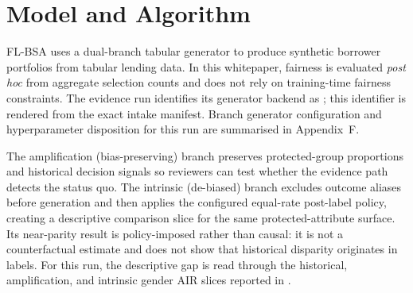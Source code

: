 
\section{Model and Algorithm}
FL-BSA uses a dual-branch tabular generator to produce synthetic borrower portfolios from tabular lending data. In this whitepaper, fairness is evaluated \emph{post hoc} from aggregate selection counts and does not rely on training-time fairness constraints. The \ProductReleaseTag{} evidence run identifies its generator backend as \texttt{\ReleaseGeneratorBackend}; this identifier is rendered from the exact intake manifest. Branch generator configuration and hyperparameter disposition for this run are summarised in Appendix~F.

The amplification (bias-preserving) branch preserves protected-group proportions and historical decision signals so reviewers can test whether the evidence path detects the status quo. The intrinsic (de-biased) branch excludes outcome aliases before generation and then applies the configured equal-rate post-label policy, creating a descriptive comparison slice for the same protected-attribute surface. Its near-parity result is policy-imposed rather than causal: it is not a counterfactual estimate and does not show that historical disparity originates in labels. For this run, the descriptive gap is read through the historical, amplification, and intrinsic gender AIR slices reported in .
